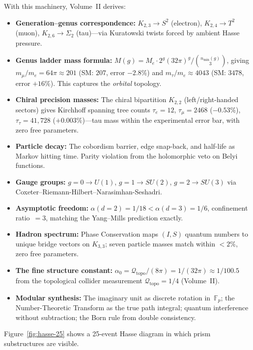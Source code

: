 \documentclass[11pt, a4paper, openany]{book}
\begin{document}
With this machinery, Volume~II derives:
\begin{itemize}
  \item \textbf{Generation--genus correspondence:} $K_{2,3} \to S^2$
    (electron), $K_{2,4} \to T^2$ (muon), $K_{2,6} \to \Sigma_2$
    (tau)---via Kuratowski twists forced by ambient Hasse pressure.
  \item \textbf{Genus ladder mass formula:}
    $M(g) = M_e \cdot 2^g (32\pi)^g / \binom{n_{\min}(g)}{3}$,
    giving $m_\mu/m_e = 64\pi \approx 201$ (SM: $207$,
    error $-2.8\%$) and $m_\tau/m_e \approx 4043$ (SM: $3478$,
    error $+16\%$). This captures the \emph{orbital} topology.
  \item \textbf{Chiral precision masses:}
    The chiral bipartition $K_{2,2}$ (left/right-handed sectors) gives
    Kirchhoff spanning tree counts
    $\tau_e = 12$, $\tau_\mu = 2468$ ($-0.53\%$),
    $\tau_\tau = 41{,}728$ ($+0.003\%$)---tau mass within the
    experimental error bar, with zero free parameters.
  \item \textbf{Particle decay:} The cobordism barrier, edge
    snap-back, and half-life as Markov hitting time. Parity violation
    from the holomorphic veto on Belyi functions.
  \item \textbf{Gauge groups:} $g = 0 \to U(1)$, $g = 1 \to SU(2)$,
    $g = 2 \to SU(3)$ via Coxeter--Riemann-Hilbert--Narasimhan-Seshadri.
  \item \textbf{Asymptotic freedom:}
    $\alpha(d{=}2) = 1/18 < \alpha(d{=}3) = 1/6$, confinement ratio~$=3$,
    matching the Yang--Mills prediction exactly.
  \item \textbf{Hadron spectrum:}
    Phase Conservation maps $(I,S)$ quantum numbers to unique bridge
    vectors on $K_{3,3}$; seven particle masses match within $<2\%$,
    zero free parameters.
  \item \textbf{The fine structure constant:} $\alpha_0 =
    \mathcal{Q}_{\mathrm{topo}}/(8\pi) = 1/(32\pi) \approx 1/100.5$
    from the topological collider measurement $\mathcal{Q}_{\mathrm{topo}} = 1/4$ (Volume~II).
  \item \textbf{Modular synthesis:} The imaginary unit as discrete
    rotation in~$\mathbb{F}_p$; the Number-Theoretic Transform as the
    true path integral; quantum interference without subtraction; the
    Born rule from double consistency.
\end{itemize}

\noindent
Figure~\ref{fig:hasse-25} shows a 25-event Hasse diagram in which prism
substructures are visible.
\end{document}

